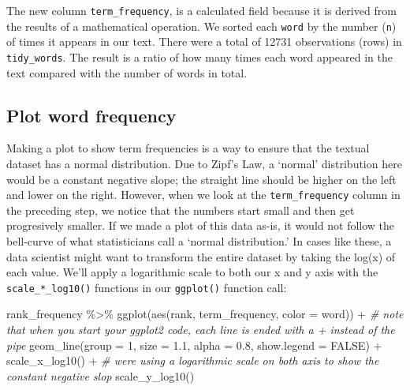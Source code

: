 \documentclass[
  krantz2]{krantz}
\makeatletter
\newenvironment{Shaded}{\begin{snugshade}}{\end{snugshade}}
\newcommand{\AttributeTok}[1]{\textcolor[rgb]{0.61,0.61,0.61}{#1}}
\newcommand{\CommentTok}[1]{\textcolor[rgb]{0.37,0.37,0.37}{\textit{#1}}}
\newcommand{\ConstantTok}[1]{\textcolor[rgb]{0,0,0}{#1}}
\newcommand{\DecValTok}[1]{\textcolor[rgb]{0.06,0.06,0.06}{#1}}
\newcommand{\FloatTok}[1]{\textcolor[rgb]{0.06,0.06,0.06}{#1}}
\newcommand{\FunctionTok}[1]{\textcolor[rgb]{0,0,0}{#1}}
\newcommand{\NormalTok}[1]{#1}
\newcommand{\SpecialCharTok}[1]{\textcolor[rgb]{0,0,0}{#1}}
\newenvironment{kframe}{%
\medskip{}
\setlength{\fboxsep}{.8em}
 \def\at@end@of@kframe{}%
 \ifinner\ifhmode%
  \def\at@end@of@kframe{\end{minipage}}%
  \begin{minipage}{\columnwidth}%
 \fi\fi%
 \def\FrameCommand##1{\hskip\@totalleftmargin \hskip-\fboxsep
 \colorbox{shadecolor}{##1}\hskip-\fboxsep
     \hskip-\linewidth \hskip-\@totalleftmargin \hskip\columnwidth}%
 \MakeFramed {\advance\hsize-\width
   \@totalleftmargin\z@ \linewidth\hsize
   \@setminipage}}%
 {\par\unskip\endMakeFramed%
 \at@end@of@kframe}
\renewenvironment{Shaded}{\begin{kframe}}{\end{kframe}}
\makeatother
\begin{document}
The new column \texttt{term\_frequency}, is a calculated field because it is derived from the results of a mathematical operation. We sorted each \texttt{word} by the number (\texttt{n}) of times it appears in our text. There were a total of 12731 observations (rows) in \texttt{tidy\_words}. The result is a ratio of how many times each word appeared in the text compared with the number of words in total.

\hypertarget{zipf}{%
\subsection{Plot word frequency}\label{zipf}}

Making a plot to show term frequencies is a way to ensure that the textual dataset has a normal distribution. Due to Zipf's Law, a `normal' distribution here would be a constant negative slope; the straight line should be higher on the left and lower on the right. However, when we look at the \texttt{term\_frequency} column in the preceding step, we notice that the numbers start small and then get progresively smaller. If we made a plot of this data as-is, it would not follow the bell-curve of what statisticians call a `normal distribution.' In cases like these, a data scientist might want to transform the entire dataset by taking the log(x) of each value. We'll apply a logarithmic scale to both our x and y axis with the \texttt{scale\_*\_log10()} functions in our \texttt{ggplot()} function call:

\begin{Shaded}
\begin{Highlighting}[]
\NormalTok{rank\_frequency }\SpecialCharTok{\%\textgreater{}\%}
  \FunctionTok{ggplot}\NormalTok{(}\FunctionTok{aes}\NormalTok{(rank, term\_frequency, }\AttributeTok{color =}\NormalTok{ word)) }\SpecialCharTok{+}  \CommentTok{\# note that when you start your ggplot2 code, each line is ended with a \textasciigrave{}+\textasciigrave{} instead of the pipe}
  \FunctionTok{geom\_line}\NormalTok{(}\AttributeTok{group =} \DecValTok{1}\NormalTok{, }\AttributeTok{size =} \FloatTok{1.1}\NormalTok{, }\AttributeTok{alpha =} \FloatTok{0.8}\NormalTok{, }\AttributeTok{show.legend =} \ConstantTok{FALSE}\NormalTok{) }\SpecialCharTok{+}
  \FunctionTok{scale\_x\_log10}\NormalTok{() }\SpecialCharTok{+} \CommentTok{\# we\textquotesingle{}re using a logarithmic scale on both axis to show the constant negative slop}
  \FunctionTok{scale\_y\_log10}\NormalTok{()}
\end{Highlighting}
\end{Shaded}
\end{document}
